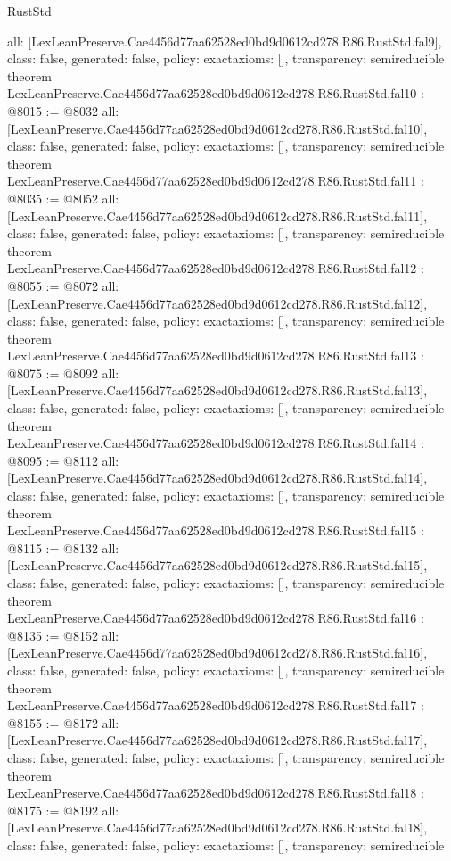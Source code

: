 \begin{lexlean}{RustStd}
\begin{coremodule}
{  all: [LexLeanPreserve.Cae4456d77aa62528ed0bd9d0612cd278.R86.RustStd.fal9],
  class: false,
  generated: false,
  policy: exact{axioms: []},
  transparency: semireducible
}
theorem LexLeanPreserve.Cae4456d77aa62528ed0bd9d0612cd278.R86.RustStd.fal10 : @8015 := @8032 {
  all: [LexLeanPreserve.Cae4456d77aa62528ed0bd9d0612cd278.R86.RustStd.fal10],
  class: false,
  generated: false,
  policy: exact{axioms: []},
  transparency: semireducible
}
theorem LexLeanPreserve.Cae4456d77aa62528ed0bd9d0612cd278.R86.RustStd.fal11 : @8035 := @8052 {
  all: [LexLeanPreserve.Cae4456d77aa62528ed0bd9d0612cd278.R86.RustStd.fal11],
  class: false,
  generated: false,
  policy: exact{axioms: []},
  transparency: semireducible
}
theorem LexLeanPreserve.Cae4456d77aa62528ed0bd9d0612cd278.R86.RustStd.fal12 : @8055 := @8072 {
  all: [LexLeanPreserve.Cae4456d77aa62528ed0bd9d0612cd278.R86.RustStd.fal12],
  class: false,
  generated: false,
  policy: exact{axioms: []},
  transparency: semireducible
}
theorem LexLeanPreserve.Cae4456d77aa62528ed0bd9d0612cd278.R86.RustStd.fal13 : @8075 := @8092 {
  all: [LexLeanPreserve.Cae4456d77aa62528ed0bd9d0612cd278.R86.RustStd.fal13],
  class: false,
  generated: false,
  policy: exact{axioms: []},
  transparency: semireducible
}
theorem LexLeanPreserve.Cae4456d77aa62528ed0bd9d0612cd278.R86.RustStd.fal14 : @8095 := @8112 {
  all: [LexLeanPreserve.Cae4456d77aa62528ed0bd9d0612cd278.R86.RustStd.fal14],
  class: false,
  generated: false,
  policy: exact{axioms: []},
  transparency: semireducible
}
theorem LexLeanPreserve.Cae4456d77aa62528ed0bd9d0612cd278.R86.RustStd.fal15 : @8115 := @8132 {
  all: [LexLeanPreserve.Cae4456d77aa62528ed0bd9d0612cd278.R86.RustStd.fal15],
  class: false,
  generated: false,
  policy: exact{axioms: []},
  transparency: semireducible
}
theorem LexLeanPreserve.Cae4456d77aa62528ed0bd9d0612cd278.R86.RustStd.fal16 : @8135 := @8152 {
  all: [LexLeanPreserve.Cae4456d77aa62528ed0bd9d0612cd278.R86.RustStd.fal16],
  class: false,
  generated: false,
  policy: exact{axioms: []},
  transparency: semireducible
}
theorem LexLeanPreserve.Cae4456d77aa62528ed0bd9d0612cd278.R86.RustStd.fal17 : @8155 := @8172 {
  all: [LexLeanPreserve.Cae4456d77aa62528ed0bd9d0612cd278.R86.RustStd.fal17],
  class: false,
  generated: false,
  policy: exact{axioms: []},
  transparency: semireducible
}
theorem LexLeanPreserve.Cae4456d77aa62528ed0bd9d0612cd278.R86.RustStd.fal18 : @8175 := @8192 {
  all: [LexLeanPreserve.Cae4456d77aa62528ed0bd9d0612cd278.R86.RustStd.fal18],
  class: false,
  generated: false,
  policy: exact{axioms: []},
  transparency: semireducible
}
\end{coremodule}
\end{lexlean}
